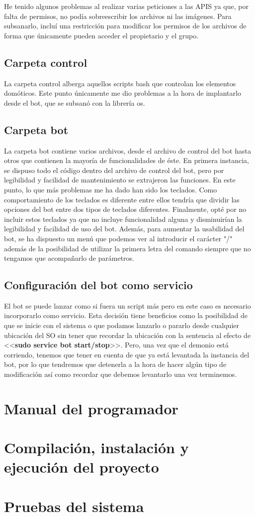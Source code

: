 He tenido algunos problemas al realizar varias peticiones a las APIS ya que, por falta de permisos, no podía sobreescribir los archivos ni las imágenes. Para subsanarlo, incluí una restricción para modificar los permisos de los archivos de forma que únicamente pueden acceder el propietario y el grupo.

\subsection{Carpeta control}
La carpeta control alberga aquellos scripts bash que controlan los elementos domóticos. Este punto únicamente me dio problemas a la hora de implantarlo desde el bot, que se subsanó con la librería os.

\subsection{Carpeta bot}
La carpeta bot contiene varios archivos, desde el archivo de control del bot hasta otros que contienen la mayoría de funcionalidades de éste. En primera instancia, se dispuso todo el código dentro del archivo de control del bot, pero por legibilidad y facilidad de mantenimiento se extrajeron las funciones.
En este punto, lo que más problemas me ha dado han sido los teclados. Como comportamiento de los teclados es diferente entre ellos tendría que dividir las opciones del bot entre dos tipos de teclados diferentes. Finalmente, opté por no incluir estos teclados ya que no incluye funcionalidad alguna y disminuirían la legibilidad y facilidad de uso del bot. Además, para aumentar la usabilidad del bot, se ha dispuesto un menú que podemos ver al introducir el carácter "/" además de la posibilidad de utilizar la primera letra del comando siempre que no tengamos que acompañarlo de parámetros.

\subsection{Configuración del bot como servicio}
El bot se puede lanzar como si fuera un script más pero en este caso es necesario incorporarlo como servicio. Esta decisión tiene beneficios como la posibilidad de que se inicie con el sistema o que podamos lanzarlo o pararlo desde cualquier ubicación del SO sin tener que recordar la ubicación con la sentencia al efecto de <<\textbf{sudo service bot start/stop}>>. Pero, una vez que el demonio está corriendo, tenemos que tener en cuenta de que ya está levantada la instancia del bot, por lo que tendremos que detenerla a la hora de hacer algún tipo de modificación así como recordar que debemos levantarlo una vez terminemos.



\section{Manual del programador}

\section{Compilación, instalación y ejecución del proyecto}

\section{Pruebas del sistema}


